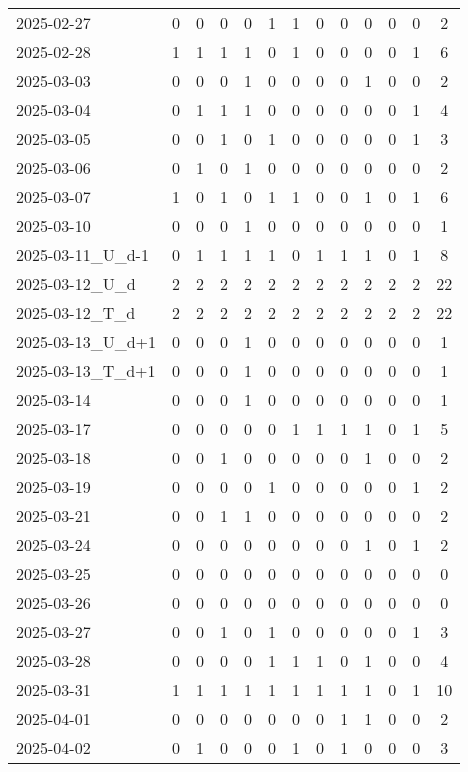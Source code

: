 \documentclass[dvipdfmx,oneside]{article}
\begin{document}
\begin{longtable}{lcccccccccccc}
2025-02-27 & 0 & 0 & 0 & 0 & 1 & 1 & 0 & 0 & 0 & 0 & 0 & 2 \\
2025-02-28 & 1 & 1 & 1 & 1 & 0 & 1 & 0 & 0 & 0 & 0 & 1 & 6 \\
2025-03-03 & 0 & 0 & 0 & 1 & 0 & 0 & 0 & 0 & 1 & 0 & 0 & 2 \\
2025-03-04 & 0 & 1 & 1 & 1 & 0 & 0 & 0 & 0 & 0 & 0 & 1 & 4 \\
2025-03-05 & 0 & 0 & 1 & 0 & 1 & 0 & 0 & 0 & 0 & 0 & 1 & 3 \\
2025-03-06 & 0 & 1 & 0 & 1 & 0 & 0 & 0 & 0 & 0 & 0 & 0 & 2 \\
2025-03-07 & 1 & 0 & 1 & 0 & 1 & 1 & 0 & 0 & 1 & 0 & 1 & 6 \\
2025-03-10 & 0 & 0 & 0 & 1 & 0 & 0 & 0 & 0 & 0 & 0 & 0 & 1 \\
2025-03-11\_U\_d-1 & 0 & 1 & 1 & 1 & 1 & 0 & 1 & 1 & 1 & 0 & 1 & 8 \\
2025-03-12\_U\_d & 2 & 2 & 2 & 2 & 2 & 2 & 2 & 2 & 2 & 2 & 2 & 22 \\
2025-03-12\_T\_d & 2 & 2 & 2 & 2 & 2 & 2 & 2 & 2 & 2 & 2 & 2 & 22 \\
2025-03-13\_U\_d+1 & 0 & 0 & 0 & 1 & 0 & 0 & 0 & 0 & 0 & 0 & 0 & 1 \\
2025-03-13\_T\_d+1 & 0 & 0 & 0 & 1 & 0 & 0 & 0 & 0 & 0 & 0 & 0 & 1 \\
2025-03-14 & 0 & 0 & 0 & 1 & 0 & 0 & 0 & 0 & 0 & 0 & 0 & 1 \\
2025-03-17 & 0 & 0 & 0 & 0 & 0 & 1 & 1 & 1 & 1 & 0 & 1 & 5 \\
2025-03-18 & 0 & 0 & 1 & 0 & 0 & 0 & 0 & 0 & 1 & 0 & 0 & 2 \\
2025-03-19 & 0 & 0 & 0 & 0 & 1 & 0 & 0 & 0 & 0 & 0 & 1 & 2 \\
2025-03-21 & 0 & 0 & 1 & 1 & 0 & 0 & 0 & 0 & 0 & 0 & 0 & 2 \\
2025-03-24 & 0 & 0 & 0 & 0 & 0 & 0 & 0 & 0 & 1 & 0 & 1 & 2 \\
2025-03-25 & 0 & 0 & 0 & 0 & 0 & 0 & 0 & 0 & 0 & 0 & 0 & 0 \\
2025-03-26 & 0 & 0 & 0 & 0 & 0 & 0 & 0 & 0 & 0 & 0 & 0 & 0 \\
2025-03-27 & 0 & 0 & 1 & 0 & 1 & 0 & 0 & 0 & 0 & 0 & 1 & 3 \\
2025-03-28 & 0 & 0 & 0 & 0 & 1 & 1 & 1 & 0 & 1 & 0 & 0 & 4 \\
2025-03-31 & 1 & 1 & 1 & 1 & 1 & 1 & 1 & 1 & 1 & 0 & 1 & 10 \\
2025-04-01 & 0 & 0 & 0 & 0 & 0 & 0 & 0 & 1 & 1 & 0 & 0 & 2 \\
2025-04-02 & 0 & 1 & 0 & 0 & 0 & 1 & 0 & 1 & 0 & 0 & 0 & 3 \\

\end{longtable}
\end{document}
